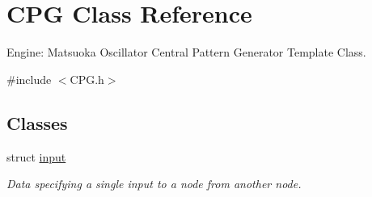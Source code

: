 \hypertarget{classCPG}{}\section{C\+PG Class Reference}
\label{classCPG}


Engine\+: Matsuoka Oscillator Central Pattern Generator Template Class.  




{\ttfamily \#include $<$C\+P\+G.\+h$>$}

\subsection*{Classes}
\begin{DoxyCompactItemize}
\item 
struct \hyperlink{structCPG_1_1input}{input}
\begin{DoxyCompactList}\small\item\em Data specifying a single input to a node from another node. \end{DoxyCompactList}\end{DoxyCompactItemize}
